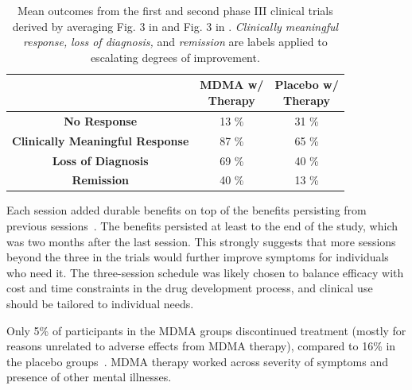 \documentclass[11pt,oneside]{book}
\let\cite\parencite
\begin{document}
\FloatBarrier
\begin{table}[htbp]
    \centering
    \caption{Mean outcomes from the first and second phase III clinical trials derived by averaging Fig. 3 in \textcite{mitchellMDMAClinicalTrial} and Fig. 3 in \textcite{mitchellMDMAClinicalTrial2}. \textit{Clinically meaningful response,} \textit{loss of diagnosis,} and \textit{remission} are labels applied to escalating degrees of improvement.}
    \label{table:efficacy}
    \begin{tabular}{|c|c|c|}
    \hline
     & \makecell{\textbf{MDMA w/}\\\textbf{Therapy}} & \makecell{\textbf{Placebo w/}\\\textbf{Therapy}} \\ \hline
    \textbf{No Response}          & 13 \%          & 31 \%          \\ \hline
    \textbf{Clinically Meaningful Response}          & 87 \%          & 65 \%         \\ \hline
    \textbf{Loss of Diagnosis} & 69 \% & 40 \% \\ \hline
    \textbf{Remission}          & 40 \%          & 13 \%          \\ \hline
    \end{tabular}
\end{table}
\FloatBarrier

Each session added durable benefits on top of the benefits persisting from previous sessions~\cite{mitchellMDMAClinicalTrial,mitchellMDMAClinicalTrial2}. The benefits persisted at least to the end of the study, which was two months after the last session. This strongly suggests that more sessions beyond the three in the trials would further improve symptoms for individuals who need it. The three-session schedule was likely chosen to balance efficacy with cost and time constraints in the drug development process, and clinical use should be tailored to individual needs.

Only 5\% of participants in the MDMA groups discontinued treatment (mostly for reasons unrelated to adverse effects from MDMA therapy), compared to 16\% in the placebo groups~\cite{mitchellMDMAClinicalTrial,mitchellMDMAClinicalTrial2}. MDMA therapy worked across severity of symptoms and presence of other mental illnesses.
\end{document}
